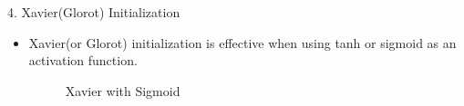 \documentclass{beamer}
\begin{document}
	\begin{frame}{4. Xavier(Glorot) Initialization}
		\begin{itemize}
			\item Xavier(or Glorot) initialization is effective when using tanh or sigmoid as an activation function.
			\vspace{10pt}
			\begin{figure}[h]
				\centering
				\quad
				\caption{Xavier with Sigmoid}
				\label{fig:sigxavier}
			\end{figure}
		\end{itemize}
	\end{frame}
\end{document}
